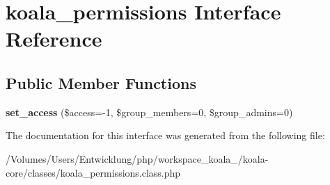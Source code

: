 \hypertarget{interfacekoala__permissions}{
\section{koala\_\-permissions Interface Reference}
\label{interfacekoala__permissions}
}
\subsection*{Public Member Functions}
\begin{DoxyCompactItemize}
\item 
\hypertarget{interfacekoala__permissions_a8c69c91de8e8b76265df02cf72c8900a}{
{\bfseries set\_\-access} (\$access=-\/1, \$group\_\-members=0, \$group\_\-admins=0)}
\label{interfacekoala__permissions_a8c69c91de8e8b76265df02cf72c8900a}

\end{DoxyCompactItemize}


The documentation for this interface was generated from the following file:\begin{DoxyCompactItemize}
\item 
/Volumes/Users/Entwicklung/php/workspace\_\-koala\_/koala-\/core/classes/koala\_\-permissions.class.php\end{DoxyCompactItemize}
